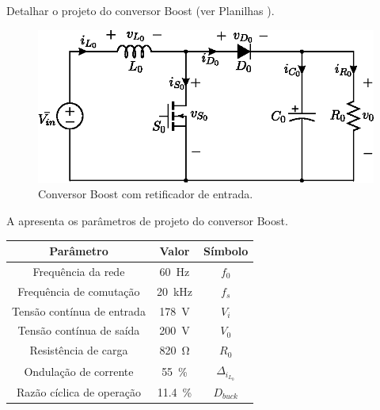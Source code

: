 Detalhar o projeto do conversor Boost (ver Planilhas \cite{noauthor_ptc_nodate}).

\begin{figure}[!h]
	\centering
	\includegraphics[width=0.9\linewidth]{Figs/Boost}
	\caption{Conversor Boost com retificador de entrada.}
	\label{fig:buck}
\end{figure}


A  apresenta os parâmetros de projeto do conversor Boost.

\begin{center}
	\label{tab:parametrosBoost}
	\begin{tabular}{@{}ccc@{}}
		\toprule
		\textbf{Parâmetro} & \textbf{Valor} & \textbf{Símbolo} \\ \midrule			
		Frequência  da rede        & \SI{60}{\hertz}     & $f_0$  \\		
		Frequência de comutação        & \SI{20}{\kilo\hertz}     & $f_s$  \\	
		Tensão contínua de entrada         &  \SI{178}{\V}      & $V_i$  \\
		Tensão contínua de saída         &  \SI{200}{\V}      & $V_0$  \\
		Resistência de carga        & \SI{820}{\ohm}      & $R_0$  \\
		Ondulação de corrente       & \SI{55}{\%}    & $\Delta_{i_{L_0}}$    \\ 
		Razão cíclica de operação       & \SI{11.4}{\%}    & $D_{buck}$    \\  \bottomrule	
	\end{tabular}
\end{center}

